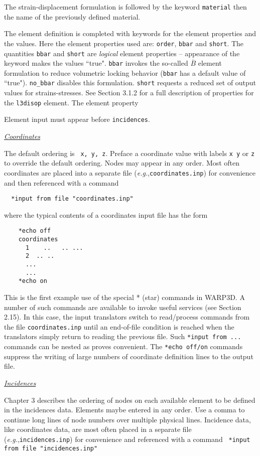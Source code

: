 \documentclass[11pt]{report}
\numberwithin{equation}{section}
\newcommand{\ttt} {\texttt}  %
\newcommand{\ul} {\underline}
\newcommand{\eg}{\emph{e.g.},\xspace}
\newcommand{\ti}{\emph}
\newcommand{\nid}{\noindent}
\begin{document}
{The strain-displacement formulation is followed by the keyword \ttt{material} then the name
of the previously defined material. 

The element definition is completed with keywords for the element properties and the values.
Here the element properties used are: \ttt{order}, \ttt{bbar} and \ttt{short}. The quantities \ttt{bbar} and
\ttt{short} are \ti{logical} element properties -- appearance of  the keyword makes the values ``true". 
\ttt{bbar} invokes the so-called $\overline B$ element formulation to reduce volumetric locking
behavior (\ttt{bbar} has a default value of ``true"). \ttt{no\_bbar} disables this formulation. 
\ttt{short} requests a reduced set of output values for strains-stresses. See Section 3.1.2
for a full description of properties for the \ttt{l3disop} element. The element property

Element input must appear before \ttt{incidences}.

\nid \ti{\ul{Coordinates} }

\nid The default ordering is \ttt{ x,  y,  z}. Preface a coordinate value with labels \ttt{x y} or \ttt{z} to override
the default ordering. Nodes may appear in any order. Most often coordinates are placed into
a separate file (\eg \ttt{coordinates.inp}) for convenience and then referenced with a 
command

\small\begin{verbatim}
  *input from file "coordinates.inp"
\end{verbatim}\normalsize
\nid
where the typical contents of a coordinates input file has the form
\small\begin{verbatim}
    *echo off
    coordinates
      1    ..   .. ...
      2  .. ..  
      ...
      ...
    *echo on
\end{verbatim}\normalsize
\nid This is the first example use of the special * (star) commands in WARP3D. A number of such commands
are available to invoke useful services (see Section 2.15). In this case, the input translators switch
to read/process commands from the file \ttt{coordinates.inp} until an end-of-file condition is reached when
the translators simply return to reading the previous file. Such \ttt{*input from ... } commands can be
nested as proves convenient. The \ttt{*echo off/on} commands suppress the writing of large
numbers of coordinate definition lines to the output file.

\nid \ti{\ul{Incidences} }

\nid Chapter 3 describes the ordering of nodes on each available element to be defined in the 
incidences data. Elements maybe entered in any order. Use a comma to continue long
lines of node numbers over multiple physical lines. Incidence data, like coordinates data,
are most often placed in a separate file (\eg \ttt{incidences.inp}) 
for convenience and referenced with a command  \ttt{ *input from file "incidences.inp"}

}
\end{document}
